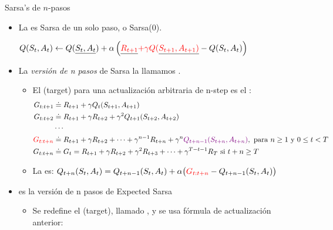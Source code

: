 \documentclass[10pt, envcountsect, handout, aspectratio=1610, hyperref={hypertexnames=true}]{beamer}
\begin{document}
	
			

\begin{frame}{Sarsa's de $n$-pasos}
	

\begin{itemize}
	\item  La  es Sarsa de un solo paso, o Sarsa(0). 
	
	\centerline{ $ Q(S_t, A_t) \gets Q(\underline{S_t, A_t}) + \alpha \left( \underline{{\color{red} R_{t+1}}} {\color{red} + \gamma Q (}\underline{{\color{red}S_{t+1}, A_{t+1})}} - Q(S_t, A_t) \right) $}
	
	
	\item  La \textit{versión de n pasos} de Sarsa la llamamos .
	
	\begin{itemize}
		\item  El  (target) para una actualización arbitraria de n-step es el :
		\begin{align*}
			G_{t:t+1} & \doteq  R_{t+1} + \gamma Q_t(S_{t+1}, A_{t+1}) \\
			G_{t:t+2} & \doteq  R_{t+1} + \gamma R_{t+2} + \gamma^2 Q_{t+1}(S_{t+2}, A_{t+2}) \\
			& \cdots  \\
			{\color{red} G_{t:t+n} } & \doteq R_{t+1} + \gamma R_{t+2} + \dots + \gamma^{n-1} R_{t+n} + \gamma^n {\color{violet} Q_{t+n-1} (S_{t+n}, A_{t+n})},	\text{ para }  n \geq 1 \text{ y } 0 \leq t < T  \\
			G_{t:t+n} & \doteq G_t = R_{t+1} + \gamma R_{t+2} + \gamma^2 R_{t+3} + \dots + \gamma^{T-t-1} R_T \text{ si } t+n\geq T
		\end{align*} 
		
		\vspace{-0.5cm}
	
	
	
		\item La  es: 
			{\normalsize $Q_{t+n}(S_t, A_t) = Q_{t+n-1}(S_t, A_t) + \alpha \big( {\color{red} G_{t:t+n}} - Q_{t+n-1}(S_t, A_t) \big)$}
	
	\end{itemize}
	
	\item {} es la versión de n pasos de Expected Sarsa
		
		\begin{itemize}
			
			\item  Se redefine el  (target), llamado , y se usa fórmula de actualización anterior:
			

\end{itemize}
\end{itemize}
\end{frame}
\end{document}

